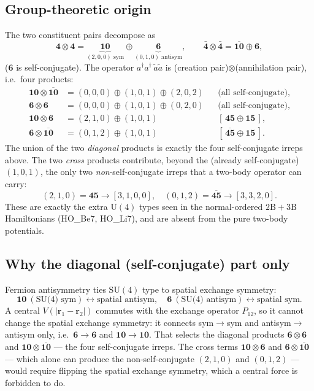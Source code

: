 \documentclass[11pt]{article}
\begin{document}
\subsection{Group-theoretic origin}
The two constituent pairs decompose as
\[
\mathbf 4\otimes\mathbf 4=\underbrace{\mathbf{10}}_{(2,0,0)\text{ sym}}
   \oplus\underbrace{\mathbf 6}_{(0,1,0)\text{ antisym}},\qquad
\bar{\mathbf 4}\otimes\bar{\mathbf 4}=\overline{\mathbf{10}}\oplus\mathbf 6 ,
\]
($\mathbf 6$ is self-conjugate). The operator
$a^\dagger a^\dagger\,\tilde a\tilde a$ is (creation pair)$\otimes$(annihilation
pair), i.e.\ four products:
\[
\begin{aligned}
\mathbf{10}\otimes\overline{\mathbf{10}} &= (0,0,0)\oplus(1,0,1)\oplus(2,0,2)
   &&\text{(all self-conjugate)},\\
\mathbf 6\otimes\mathbf 6 &= (0,0,0)\oplus(1,0,1)\oplus(0,2,0)
   &&\text{(all self-conjugate)},\\
\mathbf{10}\otimes\mathbf 6 &= (2,1,0)\oplus(1,0,1)
   &&[\,\mathbf{45}\oplus\mathbf{15}\,],\\
\mathbf 6\otimes\overline{\mathbf{10}} &= (0,1,2)\oplus(1,0,1)
   &&[\,\overline{\mathbf{45}}\oplus\mathbf{15}\,].
\end{aligned}
\]
The union of the two \emph{diagonal} products is exactly the four self-conjugate
irreps above. The two \emph{cross} products contribute, beyond the (already
self-conjugate) $(1,0,1)$, the only two \emph{non}-self-conjugate irreps that a
two-body operator can carry:
\[
(2,1,0)=\mathbf{45}\to[3,1,0,0],\quad
(0,1,2)=\overline{\mathbf{45}}\to[3,3,2,0].
\]
These are exactly the extra $\mathrm{U}(4)$ types seen in the normal-ordered
$2\mathrm{B}{+}3\mathrm{B}$ Hamiltonians (HO\_Be7, HO\_Li7), and are absent from
the pure two-body potentials.

\subsection{Why the diagonal (self-conjugate) part only}
Fermion antisymmetry ties $\mathrm{SU}(4)$ type to spatial exchange symmetry:
\[
\mathbf{10}\ (\text{SU(4) sym})\leftrightarrow\text{spatial antisym},\quad
\mathbf 6\ (\text{SU(4) antisym})\leftrightarrow\text{spatial sym}.
\]
A central $V(|\mathbf r_1-\mathbf r_2|)$ commutes with the exchange operator
$P_{12}$, so it cannot change the spatial exchange symmetry: it connects
sym$\to$sym and antisym$\to$antisym only, i.e.\ $\mathbf 6\to\mathbf 6$ and
$\mathbf{10}\to\mathbf{10}$. That selects the diagonal products
$\mathbf 6\otimes\mathbf 6$ and $\mathbf{10}\otimes\overline{\mathbf{10}}$ ---
the four self-conjugate irreps. The cross terms $\mathbf{10}\otimes\mathbf 6$
and $\mathbf 6\otimes\overline{\mathbf{10}}$ --- which alone can produce the
non-self-conjugate $(2,1,0)$ and $(0,1,2)$ --- would require flipping the
spatial exchange symmetry, which a central force is forbidden to do.
\end{document}
